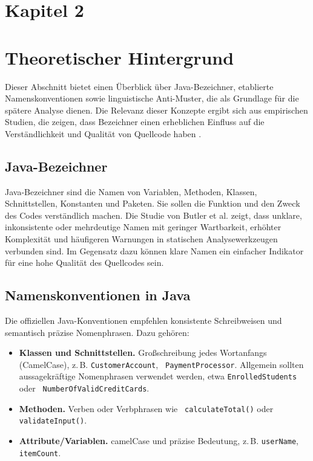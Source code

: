 \documentclass[a4paper,12pt]{article}
\begin{document}

\newpage
\section*{Kapitel 2}
\section{Theoretischer Hintergrund}
Dieser Abschnitt bietet einen Überblick über Java-Bezeichner, etablierte
Namenskonventionen sowie linguistische Anti-Muster, die als Grundlage für die
spätere Analyse dienen. Die Relevanz dieser Konzepte ergibt sich aus
empirischen Studien, die zeigen, dass Bezeichner einen erheblichen Einfluss auf
die Verständlichkeit und Qualität von Quellcode haben
\cite{identifiernamesinfluencecodequality}.

\subsection{Java-Bezeichner}

Java-Bezeichner sind die Namen von Variablen, Methoden, Klassen,
Schnittstellen, Konstanten und Paketen. Sie sollen die Funktion und den Zweck
des Codes verständlich machen. Die Studie von Butler et al.
\cite{identifiernamesinfluencecodequality} zeigt, dass unklare, inkonsistente
oder mehrdeutige Namen mit geringer Wartbarkeit, erhöhter Komplexität und
häufigeren Warnungen in statischen Analysewerkzeugen verbunden sind. Im
Gegensatz dazu können klare Namen ein einfacher Indikator für eine hohe
Qualität des Quellcodes sein.

\subsection{Namenskonventionen in Java}

Die offiziellen Java-Konventionen \cite{oracle} empfehlen konsistente
Schreibweisen und semantisch präzise Nomenphrasen. Dazu gehören:

\begin{itemize}
    \item \textbf{Klassen und Schnittstellen.} Großschreibung jedes Wortanfangs (CamelCase), z.\,B. \texttt{CustomerAccount}, \texttt{ PaymentProcessor}. Allgemein sollten aussagekräftige Nomenphrasen verwendet werden, etwa \texttt{EnrolledStudents} oder \texttt{ NumberOfValidCreditCards}.
    \item \textbf{Methoden.} Verben oder Verbphrasen wie \texttt{ calculateTotal()} oder \texttt{validateInput()}.
    \item \textbf{Attribute/Variablen.} camelCase und präzise Bedeutung, z.\,B. \texttt{userName}, \texttt{itemCount}.
\end{itemize}
\end{document}
